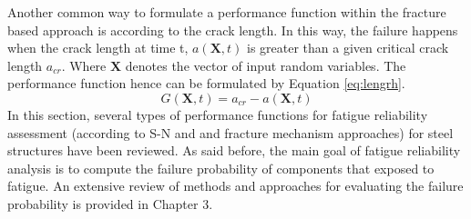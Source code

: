 Another common way to formulate a performance function within the fracture based approach is according to the crack length. In this way, the failure happens when the crack length at time t, $a(\textbf{X},t)$
is greater than a given critical crack length $a_{cr}$. Where $\textbf{X}$ denotes the vector of input random variables. The performance function hence can be formulated by Equation \ref{eq:lengrh}.
\begin{equation}
 G(\textbf{X},t)= a_{cr}-a(\textbf{X},t)
 \label{eq:lengrh}
\end{equation}
\noindent
In this section, several types of performance functions for fatigue reliability assessment (according to S-N and and fracture mechanism approaches) for steel structures have been reviewed. As said before,
the main goal of fatigue reliability analysis is to compute the failure probability of components that exposed to fatigue. An extensive review of methods and approaches for evaluating the failure probability
is provided in Chapter 3. 


